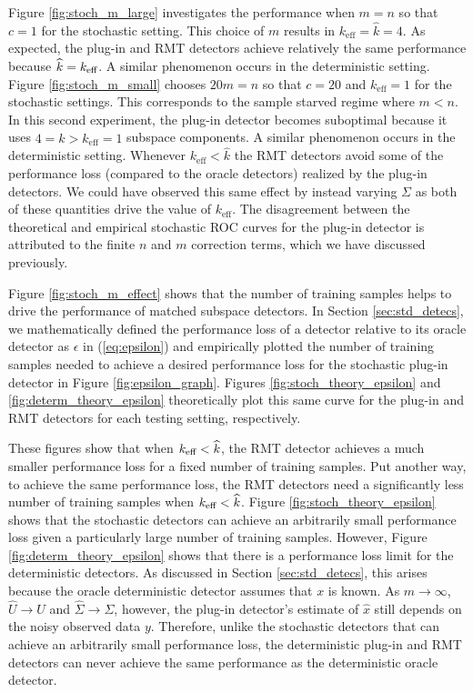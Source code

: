 Figure \ref{fig:stoch_m_large} investigates the performance when $m=n$ so that $c=1$ for
the stochastic setting.  This
choice of $m$ results in $k_\text{eff}=\widehat{k}=4$. As expected, the plug-in and RMT
detectors achieve relatively the same performance because $\widehat{k}=k_\text{eff}$. A similar
phenomenon occurs in the deterministic setting. Figure
\ref{fig:stoch_m_small} chooses $20m=n$ so that $c=20$ and $k_\text{eff}=1$ for the
stochastic settings. This corresponds to the sample starved regime where $m<n$. In this
second experiment, the plug-in detector becomes suboptimal because it uses $4=\widehat{k}
> k_\text{eff}=1$ subspace components. A similar phenomenon occurs in the deterministic
setting. Whenever $k_\text{eff}<\widehat{k}$ the RMT detectors avoid some of the performance loss (compared to the oracle detectors) realized by the plug-in detectors. We could have observed this same effect by instead varying $\Sigma$ as both of these quantities drive the value of $k_\text{eff}$. The disagreement between the theoretical and empirical stochastic ROC curves for the plug-in detector is attributed to the finite $n$ and $m$ correction terms, which we have discussed previously.

Figure \ref{fig:stoch_m_effect} shows that the number of training samples helps to drive the performance of matched subspace detectors. In Section \ref{sec:std_detecs}, we mathematically defined the performance loss of a detector relative to its oracle detector as $\epsilon$ in (\ref{eq:epsilon}) and empirically plotted the number of training samples needed to achieve a desired performance loss for the stochastic plug-in detector in Figure \ref{fig:epsilon_graph}. Figures \ref{fig:stoch_theory_epsilon} and \ref{fig:determ_theory_epsilon} theoretically plot this same curve for the plug-in and RMT detectors for each testing setting, respectively.

These figures show that when $k_\text{eff}<\widehat{k}$, the RMT detector achieves a much smaller performance loss for a fixed number of training samples. Put another way, to achieve the same performance loss, the RMT detectors need a significantly less number of training samples when $k_\text{eff}<\widehat{k}$. Figure \ref{fig:stoch_theory_epsilon} shows that the stochastic detectors can achieve an arbitrarily small performance loss given a particularly large number of training samples. However, Figure \ref{fig:determ_theory_epsilon} shows that there is a performance loss limit for the deterministic detectors. As discussed in Section \ref{sec:std_detecs}, this arises because the oracle deterministic detector assumes that $x$ is known. As $m\to\infty$, $\widehat{U}\to U$ and $\widehat{\Sigma}\to\Sigma$, however, the plug-in detector's estimate of $\widehat{x}$ still depends on the noisy observed data $y$. Therefore, unlike the stochastic detectors that can achieve an arbitrarily small performance loss, the deterministic plug-in and RMT detectors can never achieve the same performance as the deterministic oracle detector.

